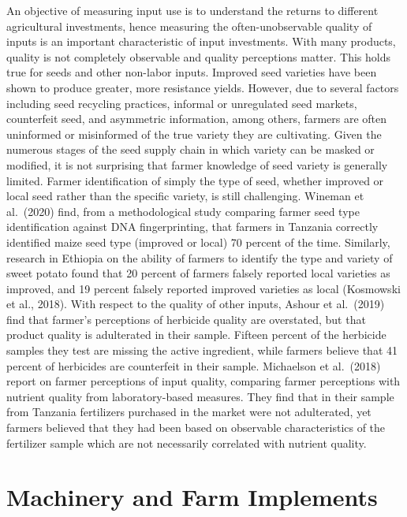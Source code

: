 \documentclass[
]{book}
\begin{document}
An objective of measuring input use is to understand the returns to different agricultural investments, hence measuring the often-unobservable quality of inputs is an important characteristic of input investments. With many products, quality is not completely observable and quality perceptions matter. This holds true for seeds and other non-labor inputs. Improved seed varieties have been shown to produce greater, more resistance yields. However, due to several factors including seed recycling practices, informal or unregulated seed markets, counterfeit seed, and asymmetric information, among others, farmers are often uninformed or misinformed of the true variety they are cultivating. Given the numerous stages of the seed supply chain in which variety can be masked or modified, it is not surprising that farmer knowledge of seed variety is generally limited. Farmer identification of simply the type of seed, whether improved or local seed rather than the specific variety, is still challenging. Wineman et al.~(2020) find, from a methodological study comparing farmer seed type identification against DNA fingerprinting, that farmers in Tanzania correctly identified maize seed type (improved or local) 70 percent of the time. Similarly, research in Ethiopia on the ability of farmers to identify the type and variety of sweet potato found that 20 percent of farmers falsely reported local varieties as improved, and 19 percent falsely reported improved varieties as local (Kosmowski et al., 2018). With respect to the quality of other inputs, Ashour et al.~(2019) find that farmer's perceptions of herbicide quality are overstated, but that product quality is adulterated in their sample. Fifteen percent of the herbicide samples they test are missing the active ingredient, while farmers believe that 41 percent of herbicides are counterfeit in their sample. Michaelson et al.~(2018) report on farmer perceptions of input quality, comparing farmer perceptions with nutrient quality from laboratory-based measures. They find that in their sample from Tanzania fertilizers purchased in the market were not adulterated, yet farmers believed that they had been based on observable characteristics of the fertilizer sample which are not necessarily correlated with nutrient quality.

\hypertarget{machinery-and-farm-implements}{%
\section{Machinery and Farm Implements}\label{machinery-and-farm-implements}}
\end{document}

